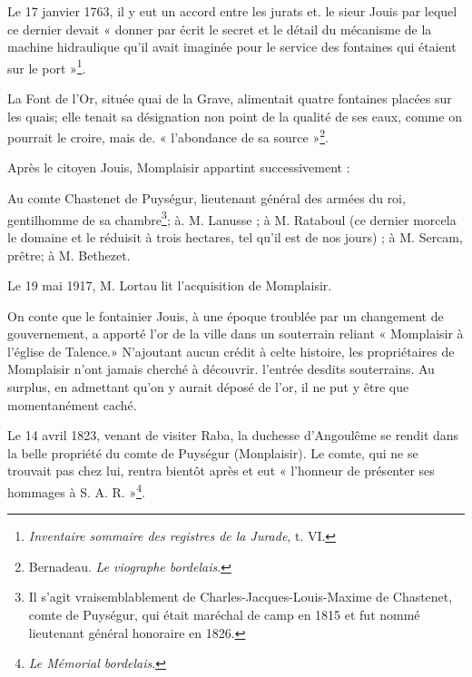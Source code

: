 Le 17 janvier 1763, il y eut un accord entre les jurats et. le sieur Jouis par lequel ce dernier devait « donner par écrit le secret et le détail du mécanisme de la machine hidraulique qu'il avait imaginée pour le service des fontaines qui étaient sur le port »\footnote{\textit{Inventaire sommaire des registres de la Jurade}, t. VI.}.

La Font de l'Or, située quai de la Grave, alimentait quatre fontaines placées sur les quais; elle tenait sa désignation non point de la qualité de ses eaux, comme on pourrait le croire, mais de. « l'abondance de sa source »\footnote{Bernadeau. \textit{Le viographe bordelais}.}.

Après le citoyen Jouis, Momplaisir appartint successivement :

Au comte Chastenet de Puységur, lieutenant général des armées du roi, gentilhomme de sa chambre\footnote{Il s'agit vraisemblablement de Charles-Jacques-Louis-Maxime de Chastenet, comte de Puységur, qui était maréchal de camp en 1815 et fut nommé lieutenant général honoraire en 1826.}; à. M. Lanusse ; à M. Rataboul (ce dernier morcela le domaine et le réduisit à trois hectares, tel qu'il est de nos jours) ; à M. Sercam, prêtre; à M. Bethezet.

Le 19 mai 1917, M. Lortau lit l'acquisition de Momplaisir.

On conte que le fontainier Jouis, à une époque troublée par un changement de gouvernement, a apporté l'or de la ville dans un souterrain reliant « Momplaisir à l'église de Talence.» N'ajoutant aucun crédit à celte histoire, les propriétaires de Momplaisir n'ont jamais cherché à découvrir. l'entrée desdits souterrains. Au surplus, en admettant qu'on y aurait déposé de l'or, il ne put y être que momentanément caché. 

Le 14 avril 1823, venant de visiter Raba, la duchesse d'Angoulême se rendit dans la belle propriété du comte de Puységur (Monplaisir). Le comte, qui ne se trouvait pas chez lui, rentra bientôt après et eut « l'honneur de présenter ses hommages à S. A. R. »\footnote{\textit{Le Mémorial bordelais}.}.